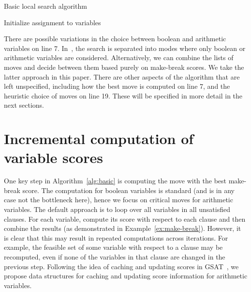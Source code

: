 \documentclass[runningheads]{llncs}
\begin{document}
\begin{algorithm}[!t]
\caption{Basic local search algorithm}
\label{alg:basic}
Initialize assignment to variables\;
\end{algorithm}

There are possible variations in the choice between boolean and arithmetic variables on line 7. In~\cite{CaiLZ22,abs-2303-06676}, the search is separated into modes where only boolean or arithmetic variables are considered. Alternatively, we can combine the lists of moves and decide between them based purely on make-break scores. We take the latter approach in this paper. There are other aspects of the algorithm that are left unspecified, including how the best move is computed on line 7, and the heuristic choice of moves on line 19. These will be specified in more detail in the next sections.

\section{Incremental computation of variable scores}
\label{sec:incremental-computation}

One key step in Algorithm~\ref{alg:basic} is computing the move with the best make-break score. The computation for boolean variables is standard (and is in any case not the bottleneck here), hence we focus on critical moves for arithmetic variables. The default approach is to loop over all variables in all unsatisfied clauses. For each variable, compute its score with respect to each clause and then combine the results (as demonstrated in Example~\ref{ex:make-break}). However, it is clear that this may result in repeated computations across iterations. For example, the feasible set of some variable with respect to a clause may be recomputed, even if none of the variables in that clause are changed in the previous step. Following the idea of caching and updating scores in GSAT~\cite{SelmanLM92}, we propose data structures for caching and updating score information for arithmetic variables.
\end{document}
